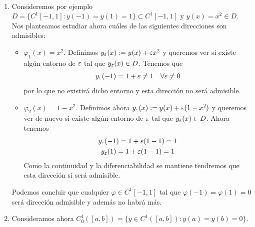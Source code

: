 \begin{ejemplo}\
    \begin{enumerate}
        \item Consideremos por ejemplo $D=\{C^1[-1,1] : y(-1)=y(1)=1\}\subset C^1[-1,1]$ y $y(x)=x^2\in D$. Nos planteamos estudiar ahora cuáles de las siguientes direcciones son admisibles:
        \begin{itemize}
            \item $\varphi_1(x) = x^2$. Definimos $y_\varepsilon(x):= y(x) + \varepsilon x^2$ y queremos ver si existe algún entorno de $\varepsilon$ tal que $y_\varepsilon(x)\in D$. Tenemos que 
            \begin{gather*}
                y_\varepsilon(-1) = 1 + \varepsilon \neq 1\ \ \ \forall \varepsilon\neq 0
            \end{gather*}
            por lo que no existirá dicho entorno y esta dirección no será admisible.
            \item $\varphi_2(x) = 1-x^2$. Definimos ahora $y_\varepsilon(x):= y(x) + \varepsilon (1 - x^2)$ y queremos ver de nuevo si existe algún entorno de $\varepsilon$ tal que $y_\varepsilon(x)\in D$. Ahora tenemos
            \begin{gather*}
                y_\varepsilon(-1) = 1 + \varepsilon(1-1) = 1\\
                y_\varepsilon(1) = 1 + \varepsilon(1-1) = 1
            \end{gather*}
            Como la continuidad y la diferenciabilidad se mantiene tendremos que esta dirección sí será admisible.
        \end{itemize}
        Podemos concluir que cualquier $\varphi\in C^1[-1,1]$ tal que $\varphi(-1)=\varphi(1)=0$ será dirección admisible y además no habrá más.

        \item Consideramos ahora $C_0^1([a,b]) = \{y\in C^1([a,b]) : y(a)=y(b)=0\}$.
    \end{enumerate}
\end{ejemplo}

